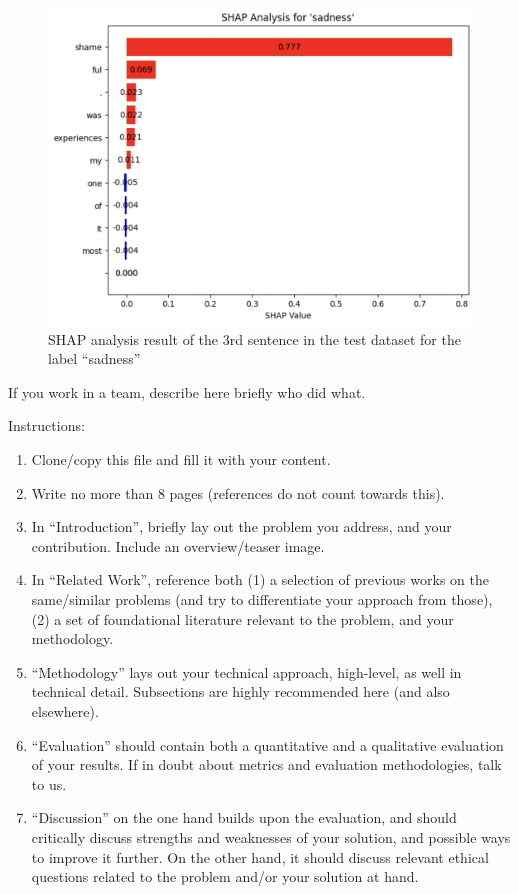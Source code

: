 \documentclass[11pt]{article}
\begin{document}
\begin{figure}[htp]
    \centering
    \includegraphics[width=0.8\linewidth]{images/figure2.jpg}
    \caption{SHAP analysis result of the 3rd sentence in the test dataset for the label “sadness”}
    \label{fig:figure2}
\end{figure}

\clearpage
\twocolumn


If you work in a team, describe here briefly who did what.

Instructions: 
\begin{enumerate}
    \item Clone/copy this file and fill it with your content.
    \item Write no more than 8 pages (references do not count towards this).
    \item In ``Introduction'', briefly lay out the problem you address, and your contribution. Include an overview/teaser image.
    \item In ``Related Work'', reference both (1) a selection of previous works on the same/similar problems (and try to differentiate your approach from those), (2) a set of foundational literature relevant to the problem, and your methodology.
    \item ``Methodology'' lays out your technical approach, high-level, as well in technical detail. Subsections are highly recommended here (and also elsewhere).
    \item ``Evaluation'' should contain both a quantitative and a qualitative evaluation of your results. If in doubt about metrics and evaluation methodologies, talk to us.
    \item ``Discussion'' on the one hand builds upon the evaluation, and should critically discuss strengths and weaknesses of your solution, and possible ways to improve it further. On the other hand, it should discuss relevant ethical questions related to the problem and/or your solution at hand.
\end{enumerate}


% 
\end{document}
